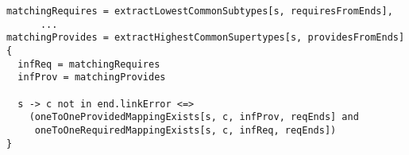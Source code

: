 \lstset{frame=tb, aboveskip=12pt, belowskip=-3pt, breaklines=true, basicstyle=\small\ttfamily, tabsize=2, mathescape=true}
\begin{lstlisting}[caption={port\_inference.als, lines 86-111}, label=alloy:port_inference, captionpos=b]
matchingRequires = extractLowestCommonSubtypes[s, requiresFromEnds],
      ...
matchingProvides = extractHighestCommonSupertypes[s, providesFromEnds]
{
  infReq = matchingRequires
  infProv = matchingProvides

  s -> c not in end.linkError <=>
    (oneToOneProvidedMappingExists[s, c, infProv, reqEnds] and
     oneToOneRequiredMappingExists[s, c, infReq, reqEnds])
}
\end{lstlisting}